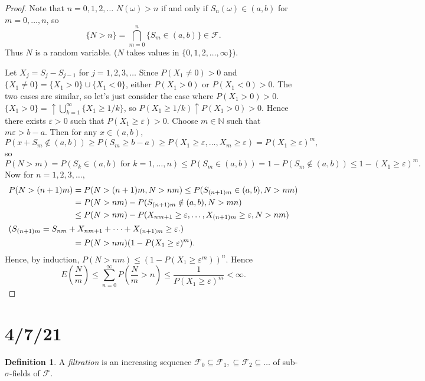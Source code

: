 \documentclass{article}
\newcommand{\N}{\mathbb{N}}
\newcommand{\F}{\mathscr{F}}
\theoremstyle{definition}
\newtheorem*{definition}{Definition}
\begin{document}
\begin{proof}
    Note that $n = 0, 1, 2, \dots$ $N(\omega) > n$ if and only if $S_n(\omega) \in (a,b)$ for $m = 0, \dots, n$, so
    \[
        \{N > n\} = \bigcap_{m = 0}^n \{S_m \in (a,b)\} \in \F.
    \]
    Thus $N$ is a random variable. ($N$ takes values in $\{0, 1, 2, \dots, \infty\}$).
    
    Let $X_j = S_j - S_{j-1}$ for $j = 1, 2, 3, \dots$ Since $P(X_1 \neq 0) > 0$ and $\{X_1 \neq 0\} = \{X_1 > 0\} \cup \{X_1 < 0\}$, either $P(X_1 > 0)$ or $P(X_1 < 0) > 0$. The two cases are similar, so let's just consider the case where $P(X_1 > 0) > 0$. $\{X_1 > 0\} = \uparrow \bigcup_{k=1}^\infty \{X_1 \geq 1/k\}$, so $P(X_1 \geq 1/k) \uparrow P(X_1 > 0) > 0$. Hence there exists $\varepsilon > 0$ such that $P(X_1 \geq \varepsilon) > 0$. Choose $m \in \N$ such that $m\varepsilon > b-a$. Then for any $x \in (a, b)$,
    \[
        P(x + S_m \notin (a,b)) \geq P(S_m \geq b-a) \geq P(X_1 \geq \varepsilon, \dots, X_m \geq \varepsilon) = P(X_1 \geq \varepsilon)^m,
    \]
    so
    \[
        P(N > m) = P(S_k \in (a,b) \text{ for } k = 1, \dots, n) \leq P(S_m \in (a, b)) = 1-P(S_m \notin (a,b)) \leq 1 - (X_1 \geq \varepsilon)^m.
    \]
    Now for $n = 1, 2, 3, \dots$,
    \begin{align*}
        P(N > (n+1)m) &= P(N > (n+1)m, N > nm) \leq P(S_{(n+1)m} \in (a,b), N > nm) \\
        &= P(N > nm) - P(S_{(n+1)m} \notin (a,b), N > mn) \\
        &\leq P(N > nm) - P(X_{nm+1} \geq \varepsilon, \dots, X_{(n+1)m} \geq \varepsilon, N > nm) \\
        \intertext{($S_{(n+1)m} = S_{nm}+ X_{nm+1} + \dots + X_{(n+1)m} \geq \varepsilon$.)}
        &= P(N > nm)(1 - P(X_1 \geq \varepsilon)^m).
    \end{align*}
    Hence, by induction, $P(N > nm) \leq (1-P(X_1 \geq \varepsilon^m))^n$. Hence 
    \[
        E\left(\frac{N}{m}\right) \leq \sum_{n = 0}^\infty P\left(\frac{N}{m} > n\right) \leq \frac{1}{P(X_1 \geq \varepsilon)^m} < \infty. 
    \]
\end{proof}

\section*{4/7/21}

\begin{definition}
A \emph{filtration} is an increasing sequence $\F_0 \subseteq \F_1, \subseteq \F_2 \subseteq \dots$ of sub-$\sigma$-fields of $\F$.
\end{definition}
\end{document}
